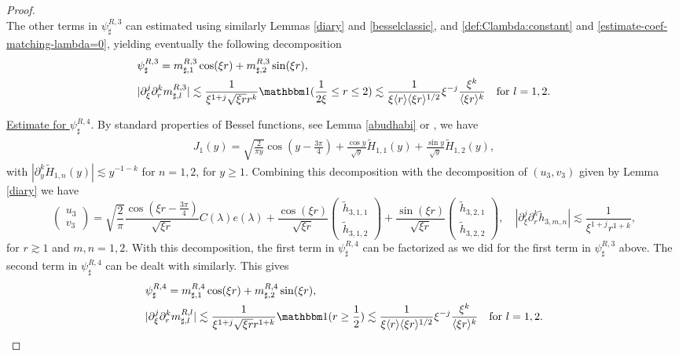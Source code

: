 \documentclass[11 pt]{amsart}
\theoremstyle{definition}
\theoremstyle{remark}
\numberwithin{equation}{section}
\begin{document}
\begin{proof}
$$$$
The other terms in $\psi^{R,3}_{\sharp}$ can estimated using similarly Lemmas \ref{diary} and \ref{besselclassic}, and \eqref{def:Clambda:constant} and \eqref{estimate-coef-matching-lambda=0}, yielding eventually the following decomposition
\begin{align}
& \psi_{\sharp}^{R,3} = m^{R,3}_{\sharp,1}\cos(\xi r)+m^{R,3}_{\sharp,2}\sin(\xi r), \\
\label{bd:msharp-inter-3}& | \partial_{\xi}^j \partial_r^k m^{R,3}_{\sharp,l}|\lesssim \frac{1}{\xi^{1+j} \sqrt{ \xi r} r^k}\mathbbm 1(\frac{1}{2\xi}\leq r \leq 2) \lesssim \frac{1}{\xi \langle r \rangle \langle \xi r \rangle^{1/2}} \xi^{- j} \frac{\xi^k}{\langle \xi r \rangle^k} \quad \mbox{for }l=1,2.
\end{align}

\noindent \underline{Estimate for $\psi_\sharp^{R,4}$}. By standard properties of Bessel functions, see Lemma \ref{abudhabi} or \cite{olver2010nist}, we have
\begin{align*}
J_1(y)=\sqrt{\frac{2}{\pi y}}\cos (y-\frac{3\pi}{4}) +\frac{\cos y}{\sqrt{y}}\widetilde H_{1,1}(y)+\frac{\sin y}{\sqrt{y}}\widetilde H_{1,2}(y),
\end{align*}
with $|\partial_y^k \widetilde H_{1,n}(y)|\lesssim y^{-1-k}$ for $n=1,2$, for $y\geq 1$. Combining this decomposition with the decomposition of $(u_3,v_3)$ given by Lemma \ref{diary} we have
$$
\begin{pmatrix} u_3\\ v_3\end{pmatrix}=\sqrt{\frac{2}{\pi}}\frac{\cos (\xi r-\frac{3\pi}{4})}{\sqrt{\xi r}}C(\lambda)e(\lambda)+\frac{\cos (\xi r)}{\sqrt{\xi r}}\begin{pmatrix} \widetilde h_{3,1,1}\\ \widetilde h_{3,1,2}\end{pmatrix}+\frac{\sin (\xi r)}{\sqrt{\xi r}}\begin{pmatrix} \widetilde h_{3,2,1}\\ \widetilde h_{3,2,2}\end{pmatrix}, \quad \left|\partial_\xi^j\partial_r^k \widetilde h_{3,m,n}\right|\lesssim \frac{1}{\xi^{1+j}r^{1+k}},
$$
for $r\gtrsim 1$ and $m,n=1,2$. With this decomposition, the first term in $\psi_{\sharp}^{R,4}$ can be factorized as we did for the first term in $\psi_{\sharp}^{R,3}$ above. The second term in $\psi_{\sharp}^{R,4}$ can be dealt with similarly. This gives
\begin{align}
\nonumber & \psi_{\sharp}^{R,4} = m^{R,4}_{\sharp,1}\cos(\xi r)+m^{R,4}_{\sharp,2}\sin(\xi r), \\
\label{bd:msharp-inter-4}& | \partial_{\xi}^j \partial_r^k m^{R,l}_{\sharp,l}|\lesssim \frac{1}{\xi^{1+j} \sqrt{ \xi r} r^{1+k}}\mathbbm 1(r\geq \frac{1}{2}) \lesssim \frac{1}{\xi \langle r \rangle \langle \xi r \rangle^{1/2}} \xi^{- j} \frac{\xi^k}{\langle \xi r \rangle^k} \quad \mbox{for }l=1,2.
\end{align}


\end{proof}
\end{document}
